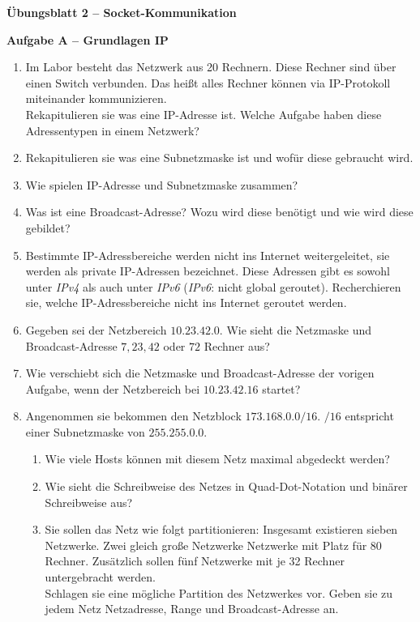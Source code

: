 \documentclass[paper=a4,fontsize=11pt]{scrartcl}%
\numberwithin{equation}{section}
\begin{document}
\begin{center}
\Large{\textbf{Übungsblatt 2 -- Socket-Kommunikation}}
\end{center}

\begin{center}\Large{\textbf{Aufgabe A -- Grundlagen IP}}\end{center}\vskip0.25in
\begin{enumerate}
	\item Im Labor besteht das Netzwerk aus 20 Rechnern. Diese Rechner sind über einen Switch verbunden. Das heißt alles Rechner können via IP-Protokoll miteinander kommunizieren.\\
	Rekapitulieren sie was eine IP-Adresse ist. Welche Aufgabe haben diese Adressentypen in einem Netzwerk?
	\item Rekapitulieren sie was eine Subnetzmaske ist und wofür diese gebraucht wird.
	\item Wie spielen IP-Adresse und Subnetzmaske zusammen?
	\item Was ist eine Broadcast-Adresse? Wozu wird diese benötigt und wie wird diese gebildet?
	\item Bestimmte IP-Adressbereiche werden nicht ins Internet weitergeleitet, sie werden als private IP-Adressen bezeichnet. Diese Adressen gibt es sowohl unter \emph{IPv4} als auch unter \emph{IPv6} (\emph{IPv6}: nicht global geroutet). Recherchieren sie, welche IP-Adressbereiche nicht ins Internet geroutet werden.
	\item Gegeben sei der Netzbereich $10.23.42.0$. Wie sieht die Netzmaske und Broadcast-Adresse $7, 23, 42$ oder $72$ Rechner aus? 
	\item Wie verschiebt sich die Netzmaske und Broadcast-Adresse der vorigen Aufgabe, wenn der Netzbereich bei $10.23.42.16$ startet?
	\item Angenommen sie bekommen den Netzblock $173.168.0.0/16$. $/16$ entspricht einer Subnetzmaske von $255.255.0.0$.
	\begin{enumerate}
		\item Wie viele Hosts können mit diesem Netz maximal abgedeckt werden?
		\item Wie sieht die Schreibweise des Netzes in Quad-Dot-Notation und binärer Schreibweise aus?
		\item Sie sollen das Netz wie folgt partitionieren: Insgesamt existieren sieben Netzwerke. Zwei gleich große Netzwerke Netzwerke mit Platz für 80 Rechner. Zusätzlich sollen fünf Netzwerke mit je 32 Rechner untergebracht werden.\\
		Schlagen sie eine mögliche Partition des Netzwerkes vor. Geben sie zu jedem Netz Netzadresse, Range und Broadcast-Adresse an.
\end{enumerate}		 
\end{enumerate}
\end{document}
